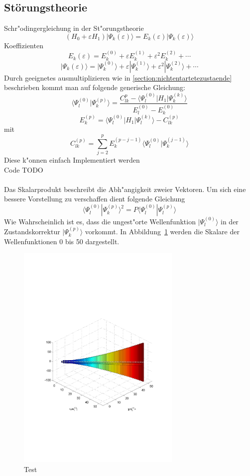 \begin{refsection}
\subsection{Störungstheorie}
Schr"odingergleichung in der St"orungstheorie
\[
(H_0+\varepsilon H_1)|\Psi_k(\varepsilon)\rangle
=
E_k(\varepsilon)|\Psi_k(\varepsilon)\rangle
\]
Koeffizienten
\[
E_k(\varepsilon)
=
E_k^{(0)}+\varepsilon E_k^{(1)}+\varepsilon^2 E_k^{(2)}+\dotsb
\]
\[
|\Psi_k(\varepsilon)\rangle
=
|\Psi_k^{(0)}\rangle+\varepsilon|\Psi_k^{(1)}\rangle+
\varepsilon^2|\Psi_k^{(2)}\rangle+\dotsb
\]
Durch geeignetes ausmultiplizieren wie in \ref{section:nichtentartetezustaende}  beschrieben kommt man auf folgende generische Gleichung:
\[
\langle\Psi_l^{(0)}|\Psi_k^{(p)}\rangle
=
\frac{C_{lk}^{p}-\langle\Psi_l^{(0)}|H_1|\Psi_k^{(k)}\rangle}
{E_l^{(0)}-E_k^{(0)}}
\]
\[
E_k^{(p)}
=
\langle\Psi_l^{(0)}|H_1|\Psi_l^{(k)}\rangle-C_{lk}^{(p)}
\]
mit
\[
C_{lk}^{(p)}
=
\displaystyle\sum_{j=2}^{p} E_k^{(p-j-1)}
\langle\Psi_l^{(0)}|\Psi_k^{(j-1)}\rangle
\]
Diese k"onnen einfach Implementiert werden\\
Code TODO\\
\\
Das Skalarprodukt beschreibt die Abh"angigkeit zweier Vektoren. Um sich eine bessere Vorstellung zu verschaffen dient folgende Gleichung
\[
\langle\Psi_l^{(0)}|\Psi_k^{(p)}\rangle^2
=
P\langle\Psi_l^{(0)}|\Psi_l^{(p)}\rangle
\]
Wie Wahrscheinlich ist es, dass die ungest"orte Wellenfunktion $|\Psi_l^{(0)}\rangle$ in der Zustandskorrektur $|\Psi_k^{(p)}\rangle$ vorkommt. In Abbildung~\ref{skript:PLK12} werden die Skalare der Wellenfunktionen 0 bis 50 dargestellt.

\begin{figure}[h]	%
\centering
\includegraphics[width=0.7\textwidth]{anharmonisch/images/x3/PLK12.pdf}
\caption{Test
\label{skript:PLK12}}
\end{figure}


\end{refsection}
